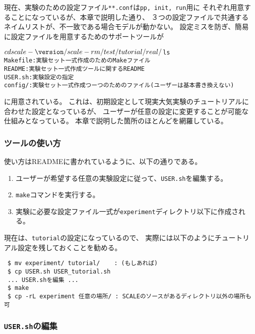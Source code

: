 \section{\SecMakeconfTool} \label{sec:basic_makeconf}

現在、実験のための設定ファイル\verb|**.conf|は\verb|pp, init, run|用に
それぞれ用意することになっているが、本章で説明した通り、
３つの設定ファイルで共通するネイムリストが、不一致である場合モデルが動かない。
設定ミスを防ぎ、簡易に設定ファイルを用意するためのサポートツールが
\begin{alltt}
 $ cd scale-{\version}/scale-rm/test/tutorial/real/
 $ ls 
    Makefile : 実験セット一式作成のためのMakeファイル
    README   : 実験セット一式作成ツールに関するREADME
    USER.sh  : 実験設定の指定
    config/  : 実験セット一式作成つーつのためのファイル(ユーザーは基本書き換えない)
\end{alltt}
に用意されている。
これは、初期設定として現実大気実験のチュートリアルに合わせた設定となっているが、
ユーザーが任意の設定に変更することが可能な仕組みとなっている。
本章で説明した箇所のほとんどを網羅している。

\subsubsection{ツールの使い方}

使い方はREADMEに書かれているように、以下の通りである。
\begin{enumerate}
  \item ユーザーが希望する任意の実験設定に従って、\verb|USER.sh|を編集する。
  \item \verb|make|コマンドを実行する。
  \item 実験に必要な設定ファイル一式が\verb|experiment|ディレクトリ以下に作成される。
\end{enumerate}

現在は、\verb|tutorial|の設定になっているので、
実際には以下のようにチュートリアル設定を残しておくことを勧める。
\begin{verbatim}
 $ mv experiment/ tutorial/    : (もしあれば)
 $ cp USER.sh USER_tutorial.sh
 ... USER.shを編集 ...
 $ make
 $ cp -rL experiment 任意の場所/ : SCALEのソースがあるディレクトリ以外の場所も可
\end{verbatim}


\subsubsection{\texttt{USER.sh}の編集}

